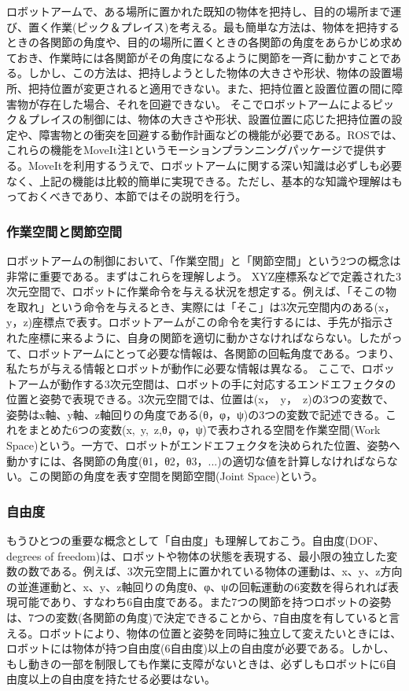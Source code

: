 ロボットアームで、ある場所に置かれた既知の物体を把持し、目的の場所まで運び、置く作業(ピック＆プレイス)を考える。最も簡単な方法は、物体を把持するときの各関節の角度や、目的の場所に置くときの各関節の角度をあらかじめ求めておき、作業時には各関節がその角度になるように関節を一斉に動かすことである。しかし、この方法は、把持しようとした物体の大きさや形状、物体の設置場所、把持位置が変更されると適用できない。また、把持位置と設置位置の間に障害物が存在した場合、それを回避できない。
そこでロボットアームによるピック＆プレイスの制御には、物体の大きさや形状、設置位置に応じた把持位置の設定や、障害物との衝突を回避する動作計画などの機能が必要である。ROSでは、これらの機能をMoveIt注1というモーションプランニングパッケージで提供する。MoveItを利用するうえで、ロボットアームに関する深い知識は必ずしも必要なく、上記の機能は比較的簡単に実現できる。ただし、基本的な知識や理解はもっておくべきであり、本節ではその説明を行う。

\subsubsection{作業空間と関節空間}

ロボットアームの制御において、「作業空間」と「関節空間」という2つの概念は非常に重要である。まずはこれらを理解しよう。
XYZ座標系などで定義された3次元空間で、ロボットに作業命令を与える状況を想定する。例えば、「そこの物を取れ」という命令を与えるとき、実際には「そこ」は3次元空間内のある(x，y，z)座標点で表す。ロボットアームがこの命令を実行するには、手先が指示された座標に来るように、自身の関節を適切に動かさなければならない。したがって、ロボットアームにとって必要な情報は、各関節の回転角度である。つまり、私たちが与える情報とロボットが動作に必要な情報は異なる。
ここで、ロボットアームが動作する3次元空間は、ロボットの手に対応するエンドエフェクタの位置と姿勢で表現できる。3次元空間では、位置は(x，\ y，\ z)の3つの変数で、姿勢はx軸、y軸、z軸回りの角度である(θ，φ，ψ)の3つの変数で記述できる。これをまとめた6つの変数(x,\ y,\ z,θ，φ，ψ)で表わされる空間を作業空間(Work Space)という。一方で、ロボットがエンドエフェクタを決められた位置、姿勢へ動かすには、各関節の角度(θ1，θ2，θ3，...)の適切な値を計算しなければならない。この関節の角度を表す空間を関節空間(Joint Space)という。

\subsubsection{自由度}

もうひとつの重要な概念として「自由度」も理解しておこう。自由度(DOF、degrees of freedom)は、ロボットや物体の状態を表現する、最小限の独立した変数の数である。例えば、3次元空間上に置かれている物体の運動は、x、y、z方向の並進運動と、x、y、z軸回りの角度θ、φ、ψの回転運動の6変数を得られれば表現可能であり、すなわち6自由度である。また7つの関節を持つロボットの姿勢は、7つの変数(各関節の角度)で決定できることから、7自由度を有していると言える。ロボットにより、物体の位置と姿勢を同時に独立して変えたいときには、ロボットには物体が持つ自由度(6自由度)以上の自由度が必要である。しかし、もし動きの一部を制限しても作業に支障がないときは、必ずしもロボットに6自由度以上の自由度を持たせる必要はない。

